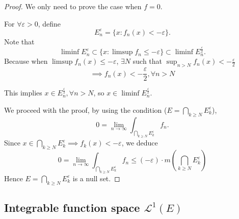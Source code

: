\begin{proof}[Proof]
	We only need to prove the case when $f=0$.

	For  $\forall\varepsilon>0$, define
	\[
	E_n^{\varepsilon} = \{x: f_n(x)< -\varepsilon\}.
	\]
	Note that
	\[
	\liminf E_n^{\varepsilon} \subset \{x: \limsup f_n\le -\varepsilon\}
	\subset \liminf E_n^{\frac{\varepsilon}{2}}.
	\]
	Because when $\limsup f_n(x)\le -\varepsilon$,  $\exists N$ such that
	$\sup_{n>N} f_n(x) < -\frac{\varepsilon}{2}$
	\[
		\implies f_n(x)<-\frac{\varepsilon}{2}, \forall n>N
	\]

	This implies $x\in E_n^{\frac{\varepsilon}{2}}, \forall n>N$,
	so $x\in\liminf E_n^{\frac{\varepsilon}{2}}$.

	We proceed with the proof,
	by using the condition ($E = \bigcap_{k\ge N}E_k^{\varepsilon}$),
    \[
	0 = \lim_{n\to \infty} \int_{\bigcap_{k\ge N}E_k^{\varepsilon}} f_n.
	\]
	Since $x\in \bigcap_{k\ge N} E_k^{\varepsilon}\implies f_k(x)<-\varepsilon$,
	we deduce
	\[
	0 = \lim_{n\to \infty} \int_{\bigcap_{k\ge N}E_k^{\varepsilon}} f_n
	\le (-\varepsilon)\cdot m(\bigcap_{k\ge N}E_k^{\varepsilon})
	\]
	Hence $E = \bigcap_{k\ge N}E_k^{\varepsilon}$ is a null set.
\end{proof}

\subsection{Integrable function space $\mathcal{L}^1(E)$}
\label{sub:Integrable function space L1}

